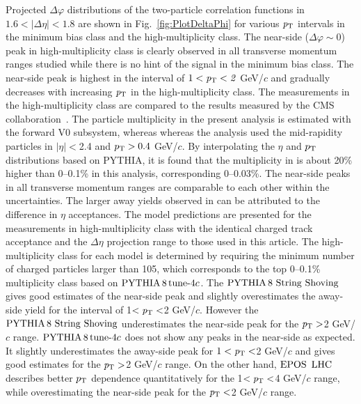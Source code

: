 Projected $\Delta\varphi$ distributions of the two-particle correlation functions in $1.6<|\Delta\eta|<1.8$ are shown in Fig.~\ref{fig:PlotDeltaPhi} for various $\it{p}_{\rm{T}}$ intervals in the minimum bias class and the high-multiplicity class. The near-side ($\Delta\varphi\sim 0$) peak in high-multiplicity class is clearly observed in all transverse momentum ranges studied while there is no hint of the signal in the minimum bias class. The near-side peak is highest in the interval of $1<\it{p}_{\rm{T}}<2$ GeV/$c$ and gradually decreases with increasing $\it{p}_{\rm{T}}$ in the high-multiplicity class. The measurements in the high-multiplicity class are compared to the results measured by the CMS collaboration~\cite{Khachatryan:2015lva}. The particle multiplicity in the present analysis is estimated with the forward V0 subsystem, whereas whereas the analysis \cite{Khachatryan:2015lva}  used the mid-rapidity particles in $|\eta|<$2.4 and $p_\mathrm{T}>0.4$ GeV/$c$. By interpolating the $\eta$ and $p_\mathrm{T}{}$ distributions based on PYTHIA, it is found that the multiplicity in \cite{Khachatryan:2015lva} is about 20\% higher than 0--0.1\% in this analysis, corresponding 0--0.03\%. The near-side peaks in all transverse momentum ranges are comparable to each other within the uncertainties. The larger away yields observed in \cite{Khachatryan:2015lva} can be attributed to the difference in $\eta$ acceptances. The model predictions are presented for the measurements in high-multiplicity class with the identical charged track acceptance and the $\Delta\eta$ projection range to those used in this article. The high-multiplicity class for each model is determined by requiring the minimum number of charged particles larger than 105, which corresponds to the top 0--0.1\% multiplicity class based on $\mathrm{PYTHIA}\,8\,\mathrm{tune}{\text -}4c$. The ${\mathrm{PYTHIA}\,8~\mathrm{String}~}\mathrm{Shoving}$ gives good estimates of the near-side peak and slightly overestimates the away-side yield for the interval of 1$<\it{p}_{\rm{T}}<$2 GeV/$c$. However the ${\mathrm{PYTHIA}\,8~\mathrm{String}~}\mathrm{Shoving}$ underestimates the near-side peak for the $\it{p}_{\rm{T}}>$2 GeV/$c$ range. $\mathrm{PYTHIA}\,8\,\mathrm{tune}{\text -}4c$ does not show any peaks in the near-side as expected. It slightly underestimates the away-side peak for $1<\it{p}_{\rm{T}}<$2 GeV/$c$ and gives good estimates for the $\it{p}_{\rm{T}}>$2 GeV/$c$ range. On the other hand, ${\mathrm{EPOS}\,~\mathrm{LHC}}$ describes better $p_\mathrm{T}$ dependence quantitatively for the 1$<\it{p}_{\rm{T}}<$4 GeV/$c$ range, while overestimating the near-side peak for the $\it{p}_{\rm{T}}<$2 GeV/$c$ range. 


